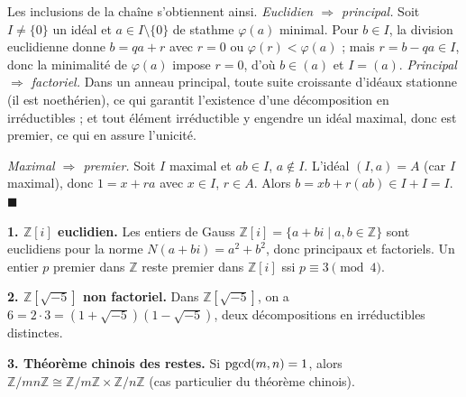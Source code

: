 \begin{ideepreuve}
  Les inclusions de la chaîne s'obtiennent ainsi.
  \emph{Euclidien $\Rightarrow$ principal.} Soit $I \neq \{0\}$ un idéal et
  $a \in I \setminus \{0\}$ de stathme $\varphi(a)$ minimal. Pour $b \in I$, la division
  euclidienne donne $b = qa + r$ avec $r = 0$ ou $\varphi(r) < \varphi(a)$ ; mais
  $r = b - qa \in I$, donc la minimalité de $\varphi(a)$ impose $r = 0$, d'où $b \in (a)$
  et $I = (a)$.
  \emph{Principal $\Rightarrow$ factoriel.} Dans un anneau principal, toute suite
  croissante d'idéaux stationne (il est noethérien), ce qui garantit l'existence d'une
  décomposition en irréductibles ; et tout élément irréductible y engendre un idéal
  maximal, donc est premier, ce qui en assure l'unicité.
\end{ideepreuve}

\begin{mdframed}[style=proofbar]
  \textit{Maximal $\Rightarrow$ premier.}
  Soit $I$ maximal et $ab \in I$, $a \notin I$. L'idéal $(I, a) = A$ (car $I$ maximal),
  donc $1 = x + ra$ avec $x \in I$, $r \in A$. Alors
  $b = xb + r(ab) \in I + I = I$. \hfill$\blacksquare$
\end{mdframed}

\decsep{}



\begin{mdframed}[style=exbar]
  \textbf{1. $\mathbb{Z}[i]$ euclidien.}\enspace%
  Les entiers de Gauss $\mathbb{Z}[i] = \{a+bi \mid a,b\in\mathbb{Z}\}$ sont euclidiens
  pour la norme $N(a+bi)=a^2+b^2$, donc principaux et factoriels. Un entier $p$ premier
  dans $\mathbb{Z}$ reste premier dans $\mathbb{Z}[i]$ ssi $p \equiv 3 \pmod 4$.

  \smallskip\noindent
  \textbf{2. $\mathbb{Z}[\sqrt{-5}]$ non factoriel.}\enspace%
  Dans $\mathbb{Z}[\sqrt{-5}]$, on a $6 = 2 \cdot 3 = (1+\sqrt{-5})(1-\sqrt{-5})$,
  deux décompositions en irréductibles distinctes.

  \smallskip\noindent
  \textbf{3. Théorème chinois des restes.}\enspace%
  Si $\operatorname{pgcd}(m,n)=1$, alors $\mathbb{Z}/mn\mathbb{Z} \cong \mathbb{Z}/m\mathbb{Z}
  \times \mathbb{Z}/n\mathbb{Z}$ (cas particulier du théorème chinois).
\end{mdframed}

